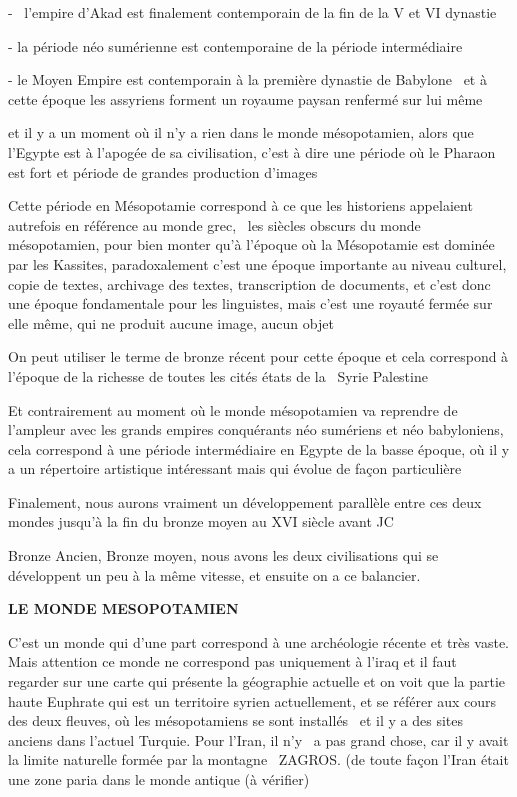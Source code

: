 \documentclass[a4paper]{article}
\begin{document}
- \ l'empire d'Akad est finalement contemporain de la fin de la V et VI dynastie

- la période néo sumérienne est contemporaine de la période intermédiaire

- le Moyen Empire est contemporain à la première dynastie de Babylone \ et à cette époque les assyriens forment un
royaume paysan renfermé sur lui même

et il y a un moment où il n'y a rien dans le monde mésopotamien, alors que l'Egypte est à l'apogée de sa civilisation,
c'est à dire une période où le Pharaon est fort et période de grandes production d'images

Cette période en Mésopotamie correspond à ce que les historiens appelaient autrefois en référence au monde grec, \ les
siècles obscurs du monde mésopotamien, pour bien monter qu'à l'époque où la Mésopotamie est dominée par les Kassites,
paradoxalement c'est une époque importante au niveau culturel, copie de textes, archivage des textes, transcription de
documents, et c'est donc une époque fondamentale pour les linguistes, mais c'est une royauté fermée sur elle même, qui
ne produit aucune image, aucun objet


On peut utiliser le terme de bronze récent pour cette époque et cela correspond à l'époque de la richesse de toutes les
cités états de la \ Syrie Palestine


Et contrairement au moment où le monde mésopotamien va reprendre de l'ampleur avec les grands empires conquérants néo
sumériens et néo babyloniens, cela correspond à une période intermédiaire en Egypte de la basse époque, où il y a un
répertoire artistique intéressant mais qui évolue de façon particulière

Finalement, nous aurons vraiment un développement parallèle entre ces deux mondes jusqu'à la fin du bronze moyen au XVI
siècle avant JC

Bronze Ancien, Bronze moyen, nous avons les deux civilisations qui se développent un peu à la même vitesse, et ensuite
on a ce balancier.


\textbf{LE MONDE MESOPOTAMIEN}


C'est un monde qui d'une part correspond à une archéologie récente et très vaste. Mais attention ce monde ne correspond
pas uniquement à l'iraq et il faut regarder sur une carte qui présente la géographie actuelle et on voit que la partie
haute Euphrate qui est un territoire syrien actuellement, et se référer aux cours des deux fleuves, où les
mésopotamiens se sont installés \ et il y a des sites anciens dans l'actuel Turquie. Pour l'Iran, il n'y \ a pas grand
chose, car il y avait la limite naturelle formée par la montagne \ ZAGROS. (de toute façon l'Iran était une zone paria
dans le monde antique (à vérifier)
\end{document}
